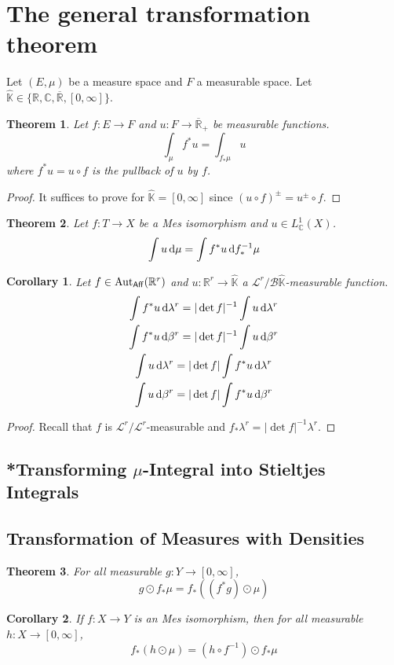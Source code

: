 \documentclass[11pt, a4paper, openany]{book}
\newtheorem{thm}{Theorem}\newtheorem{lem}{Lemma}\newtheorem{crl}{Corollary}
\theoremstyle{definition}
\DeclareMathOperator{\Aut}{Aut}
\newcommand{\cat}[1]{\textup{\textsf{#1}}}
\newcommand{\er}{\overline{\mathbb{R}}}
\begin{document}
\section{The general transformation theorem}
    Let $(E,\mu)$ be a measure space and $F$ a measurable space. Let $\hat{\mathbb{K}}\in\{\mathbb{R},\mathbb{C},\er,[0,\infty]\}$.
    \begin{thm}
        Let $f:E\rightarrow F$ and $u:F\rightarrow \er_+$ be measurable functions.
        \[\int_\mu f^* u=\int_{f_*\mu} u\]
        where $f^* u=u\circ f$ is the pullback of $u$ by $f$.
    \end{thm}
    \begin{proof}
        It suffices to prove for $\hat{\mathbb{K}}=[0,\infty]$ since $(u\circ f)^\pm=u^\pm\circ f$.
    \end{proof}
    \begin{thm}
        Let $f:T\rightarrow X$ be a \cat{Mes} isomorphism and $u\in L^1_{\mathbb{C}}(X)$.
        \[
            \int u\odif \mu=\int f^*u\odif f^{-1}_*\mu
        \]
    \end{thm}
    \begin{crl}\label{transformation theorem for affine automorphisms}
        Let $f\in\Aut_\cat{Aff}(\mathbb{R}^r)$ and $u:\mathbb{R}^r\rightarrow \hat{\mathbb{K}}$ a $\mathscr{L}^r/\mathscr{B}\hat{\mathbb{K}}$-measurable function.
        \begin{gather*}
            \int f^*u\odif\lambda^r=|\det f|^{-1}\int u \odif \lambda^r\\
            \int f^*u\odif\beta^r=|\det f|^{-1}\int u \odif \beta^r\\
            \int u\odif\lambda^r=|\det f|\int f^*u\odif \lambda^r\\
            \int u\odif\beta^r=|\det f|\int f^*u \odif \beta^r
        \end{gather*}
    \end{crl}
    \begin{proof}
        Recall that $f$ is $\mathscr{L}^r/\mathscr{L}^r$-measurable and $f_*\lambda^r=|\det f|^{-1}\lambda^r$.
    \end{proof}
\subsection{*Transforming \texorpdfstring{$\mu$}{mu}-Integral into Stieltjes Integrals}
\subsection{Transformation of Measures with Densities}
    \begin{thm}
        For all measurable $g:Y\rightarrow [0,\infty]$,
        \[
            g\odot f_*\mu=f_*((f^*g)\odot \mu)
        \]
    \end{thm}
    \begin{crl}
        If $f:X\rightarrow Y$ is an \cat{Mes} isomorphism, then for all measurable $h:X\rightarrow [0,\infty]$,
        \[
            f_*(h\odot \mu)=(h\circ f^{-1})\odot f_*\mu
        \]
    \end{crl}
\end{document}
